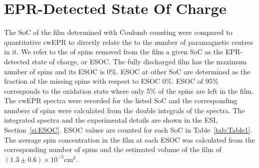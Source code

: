\section{EPR-Detected State Of Charge}
\label{sec:ESOC}

The SoC of the film determined with Coulomb counting were compared to quantitative cwEPR to directly relate the \rs{,} to the number of paramagnetic centres in it. We refer to the  of spins removed from the  film  a given SoC as the EPR-detected state of charge, or ESOC. The fully discharged film has the maximum number of spins and its ESOC is 0\%. ESOC at other SoC are determined as the fraction of the missing spins with respect to ESOC 0\%. ESOC of 95\%  corresponds to the oxidation state where only 5\% of the  spins are left in the film. The cwEPR spectra were recorded for the listed SoC\rs{,} and the corresponding numbers of spins were calculated from the double integrals of the spectra. The integrated spectra and the experimental details are shown in the ESI, Section~\ref{si:ESOC}.  ESOC values are counted for each SoC in Table~\ref{tab:Table1}. The average spin concentration in the film  at each ESOC was calculated from the corresponding number of spins and the estimated volume of the film of $\left(1.3\pm0.6\right)\times10^{-5}$cm$^{3}$.



